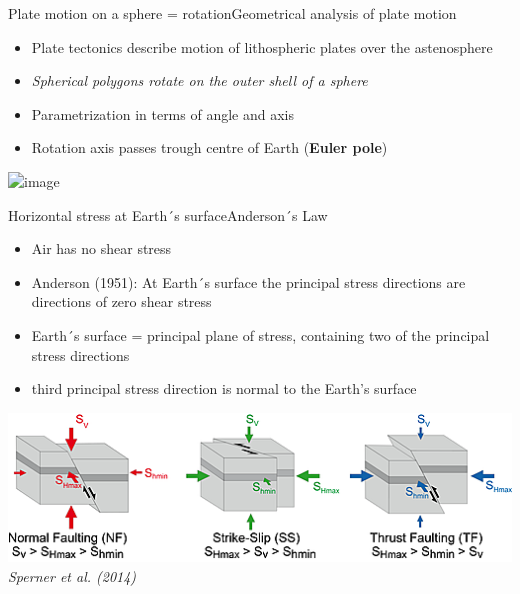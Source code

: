 \documentclass[10pt,xcolor=dvipsnames, aspectratio=169]{beamer}
\begin{document}
	\begin{frame}{Plate motion on a sphere = rotation}{Geometrical analysis of plate motion}
	\begin{minipage}{.49\linewidth}
	\small
	  \begin{itemize}[<+->]
        \item Plate tectonics describe motion of lithospheric plates over the astenosphere
	    \item \textit{Spherical polygons rotate on the outer shell of a sphere}
	    \item Parametrization in terms of angle and axis
	    \item Rotation axis passes trough centre of Earth (\textbf{Euler pole})
	  \end{itemize}
	\end{minipage}
    \hfill
    \begin{minipage}{.49\linewidth}
    \centering
	\includegraphics<1->[height=.8\textheight]{euler_pole1.png}	
    \end{minipage}	
	\end{frame}		
	

	\begin{frame}{Horizontal stress at Earth´s surface}{Anderson´s Law}
	\begin{minipage}{.4\linewidth}
	  \begin{itemize}[<+->]
        \item Air has no shear stress
        \item Anderson (1951): At Earth´s surface the principal stress directions are directions of zero shear stress 
	    \item Earth´s surface = principal plane of stress, containing two of the principal stress directions
	    \item third principal stress direction is normal to the Earth's surface
	  \end{itemize}
	\end{minipage}
    \hfill
    \begin{minipage}{.59\linewidth}
    \centering	
	\includegraphics[width=\linewidth]{stress}	
	\tiny\textit{Sperner et al. (2014)}
    \end{minipage}	
	\end{frame}	
	
\end{document}
